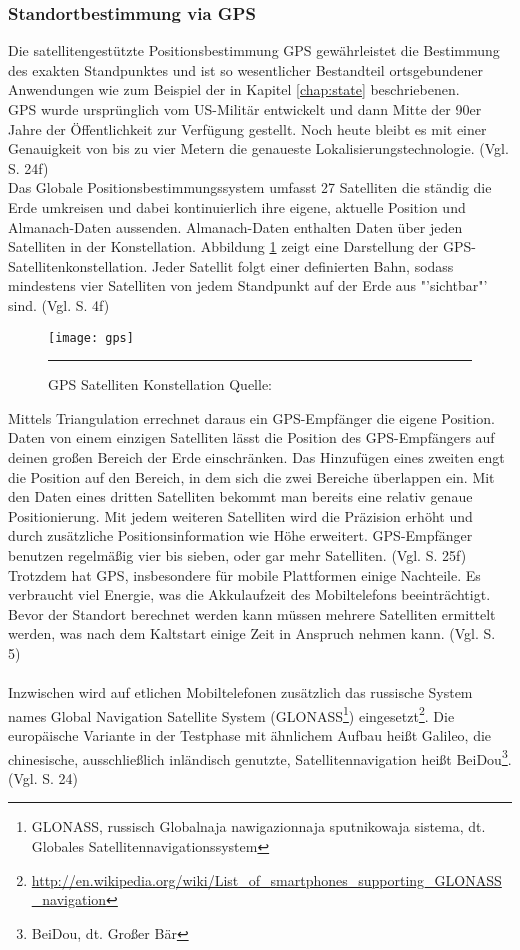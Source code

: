 \subsubsection{Standortbestimmung via \gls{GPS}}
Die satellitengestützte Positionsbestimmung \gls{GPS} gewährleistet die Bestimmung des exakten Standpunktes und ist so wesentlicher Bestandteil ortsgebundener Anwendungen wie zum Beispiel der in Kapitel \ref{chap:state} beschriebenen. \\
\gls{GPS} wurde ursprünglich vom US-Militär entwickelt und dann Mitte der 90er Jahre der Öffentlichkeit zur Verfügung gestellt. Noch heute bleibt es mit einer Genauigkeit von bis zu vier Metern die genaueste Lokalisierungstechnologie. (Vgl. \cite{gps} S. 24f)\\
Das Globale Positionsbestimmungssystem umfasst 27 Satelliten die ständig die Erde umkreisen und dabei kontinuierlich ihre eigene, aktuelle Position und Almanach-Daten aussenden. Almanach-Daten enthalten Daten über jeden Satelliten in der Konstellation. Abbildung \ref{fig:gps} zeigt eine Darstellung der GPS-Satellitenkonstellation. Jeder Satellit folgt einer definierten Bahn, sodass mindestens vier Satelliten von jedem Standpunkt auf der Erde aus "'sichtbar"' sind. (Vgl. \cite{location} S. 4f)
\begin{figure}[H]  
    \centering  
    \texttt{[image: gps]} 
    \rule{35em}{0.5pt}
    \caption[GPS Satelliten Konstellation]{GPS Satelliten Konstellation  Quelle: \cite{fig:gps}}
    \label{fig:gps}
\end{figure}
Mittels Triangulation errechnet daraus ein \gls{GPS}-Empfänger die eigene Position. Daten von einem einzigen Satelliten lässt die Position des \gls{GPS}-Empfängers auf deinen großen Bereich der Erde einschränken. Das Hinzufügen eines zweiten engt die Position auf den Bereich, in dem sich die zwei Bereiche überlappen ein. Mit den Daten eines dritten Satelliten bekommt man bereits eine relativ genaue Positionierung. Mit jedem weiteren Satelliten wird die Präzision erhöht und durch zusätzliche Positionsinformation wie Höhe erweitert. \gls{GPS}-Empfänger benutzen regelmäßig vier bis sieben, oder gar mehr Satelliten. (Vgl. \cite{gps} S. 25f)\\
Trotzdem hat \gls{GPS}, insbesondere für mobile Plattformen einige Nachteile. Es verbraucht viel Energie, was die Akkulaufzeit des Mobiltelefons beeinträchtigt. Bevor der Standort berechnet werden kann müssen mehrere Satelliten ermittelt werden, was nach dem Kaltstart einige Zeit in Anspruch nehmen kann. (Vgl. \cite{location} S. 5)\\\\
Inzwischen wird auf etlichen Mobiltelefonen zusätzlich das russische System names Global Navigation Satellite System (GLONASS\footnote{ GLONASS, russisch Globalnaja nawigazionnaja sputnikowaja sistema, dt. Globales Satellitennavigationssystem}) eingesetzt\footnote{ \url{http://en.wikipedia.org/wiki/List_of_smartphones_supporting_GLONASS_navigation}}.
Die europäische Variante in der Testphase mit ähnlichem Aufbau heißt Galileo, die chinesische, ausschließlich inländisch genutzte, Satellitennavigation heißt BeiDou\footnote{ BeiDou, dt. Großer Bär}. (Vgl. \cite{gps} S. 24)
